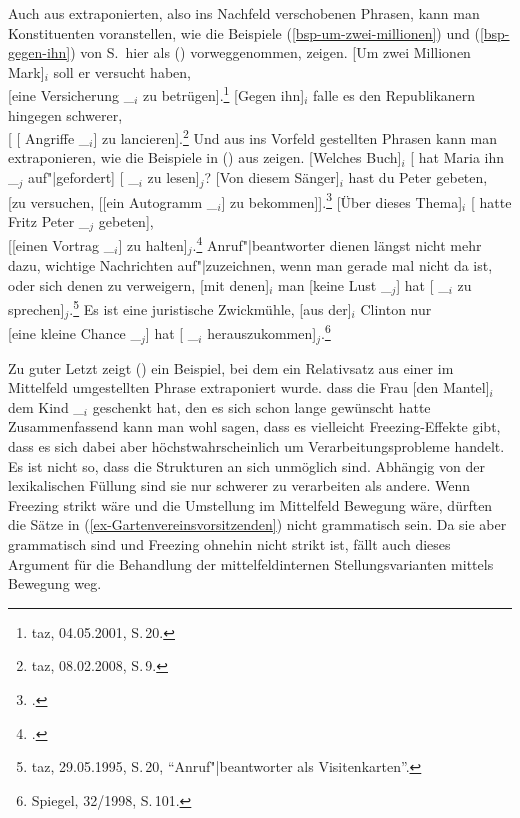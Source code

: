 \begin{exe}
\begin{xlist}
Auch aus extraponierten, also ins Nachfeld verschobenen Phrasen, kann man Konstituenten
voranstellen, wie die Beispiele (\ref{bsp-um-zwei-millionen}) und (\ref{bsp-gegen-ihn}) von
S.\,\pageref{bsp-um-zwei-millionen} hier als () vorweggenommen, zeigen.
\eal
\ex
{}[Um zwei Millionen Mark]$_i$ soll er versucht haben,\\{}[eine Versicherung \_$_i$ zu betrügen].\footnote{
         taz, 04.05.2001, S.\,20.
}
\ex {}[Gegen ihn]$_i$ falle es den Republikanern hingegen schwerer,\\ {}[\kern1pt [ Angriffe \_$_i$] zu lancieren].\footnote{
  taz, 08.02.2008, S.\,9.
}
\zl
Und aus ins Vorfeld gestellten Phrasen kann man extraponieren, wie die Beispiele in () aus 
zeigen.
\eal
\label{bsp-ex+topik}
\ex {}[Welches Buch]$_i$ [ hat Maria ihn \_$_j$ auf"|gefordert] [ \_$_i$ zu lesen]$_j$?\label{bsp-aufgefordert-zu-lesen}
\ex {}[Von diesem Sänger]$_i$ hast du Peter gebeten, \\
    {}[zu versuchen, [[ein Autogramm \_$_i$] zu bekommen]].\footnote{
	\citet*[76]{Uszkoreit87a}.
}
\ex {}[Über dieses Thema]$_i$ [ hatte Fritz Peter \_$_j$ gebeten],\\ 
    {}[[einen Vortrag \_$_i$] zu halten]$_j$.\footnote{
        \citet*[21]{HN89b}.
}
\ex Anruf"|beantworter dienen längst nicht mehr dazu, wichtige Nachrichten auf"|zuzeichnen, wenn
        man gerade mal nicht da ist, oder sich denen zu verweigern, [mit denen]$_i$ man [keine Lust \_$_j$]
        hat [ \_$_i$ zu sprechen]$_j$.\footnote{
        taz, 29.05.1995, S.\,20, "`Anruf"|beantworter als Visitenkarten"'.
        }
\ex Es ist eine juristische Zwickmühle, [aus der]$_i$ Clinton nur\\{}[eine kleine Chance \_$_j$]
      hat [ \_$_i$ herauszukommen]$_j$.\footnote{
        Spiegel, 32/1998, S.\,101.
      }\label{bsp-chance-hat-herauszukommen}
\zl

\noindent
Zu guter Letzt zeigt () ein Beispiel, bei dem ein Relativsatz aus einer im Mittelfeld
umgestellten Phrase extraponiert wurde.
\ea
dass die Frau [den Mantel]$_i$ dem Kind \_$_i$ geschenkt hat, den es sich schon lange gewünscht hatte 
\z
Zusammenfassend kann man wohl sagen, dass es vielleicht Freezing-Effekte gibt, dass es sich dabei
aber höchstwahrscheinlich um Verarbeitungsprobleme handelt. Es ist nicht so, dass die
Strukturen an sich unmöglich sind. Abhängig von der lexikalischen Füllung sind sie nur schwerer zu
verarbeiten als andere. Wenn Freezing strikt wäre und die Umstellung im Mittelfeld Bewegung wäre,
dürften die Sätze in (\ref{ex-Gartenvereinsvorsitzenden}) nicht grammatisch sein. Da sie aber grammatisch sind und Freezing
ohnehin nicht strikt ist, fällt auch dieses Argument für die Behandlung der mittelfeldinternen
Stellungsvarianten mittels Bewegung weg.
%



\end{xlist}
\end{exe}
